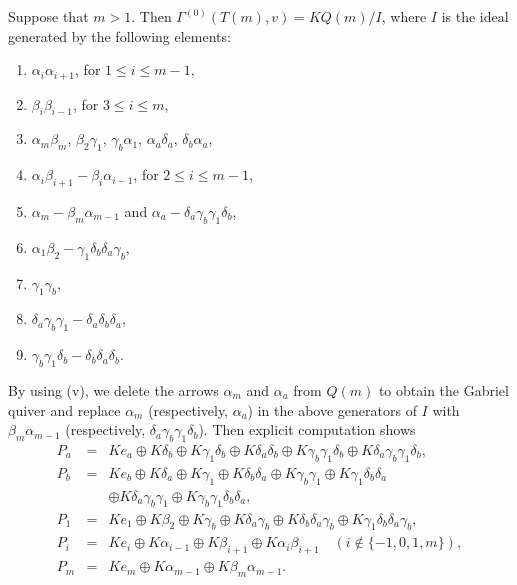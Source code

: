 \documentclass[12pt]{amsart}
\numberwithin{equation}{thm}
\begin{document}
Suppose that $m>1$. Then $\Gamma^{(0)}(T(m),v)=KQ(m)/I$, where $I$ is the ideal generated by the following elements:
\begin{enumerate}
\item $\alpha_{i}\alpha_{i+1}$, for $1\leq i\leq m-1$, 
\item $\beta_{i}\beta_{i-1}$, for $3\leq i\leq m$, 
\item $\alpha_{m}\beta_{m}$, $\beta_{2}\gamma_{1}$, $\gamma_b\alpha_1$, $\alpha_a\delta_a$, $\delta_b\alpha_a$,
\item $\alpha_{i}\beta_{i+1}-\beta_{i}\alpha_{i-1}$, for $2\leq i\leq m-1$, 
\item $\alpha_{m}-\beta_{m}\alpha_{m-1}$ and $\alpha_a-\delta_a\gamma_b\gamma_{1}\delta_b$,
\item $\alpha_{1}\beta_{2}-\gamma_{1}\delta_{b}\delta_{a}\gamma_{b}$,
\item $\gamma_{1}\gamma_{b}$,
\item $\delta_{a}\gamma_{b}\gamma_{1}-\delta_{a}\delta_{b}\delta_{a}$,
\item $\gamma_{b}\gamma_{1}\delta_{b}-\delta_{b}\delta_{a}\delta_{b}.$
\end{enumerate}
By using (v), we delete the arrows $\alpha_m$ and $\alpha_a$ from $Q(m)$ to obtain the Gabriel quiver  
and replace $\alpha_m$ (respectively, $\alpha_a$) in the above generators of 
$I$ with $\beta_{m}\alpha_{m-1}$ (respectively, $\delta_{a}\gamma_{b}\gamma_{1}\delta_{b}$). 
Then explicit computation shows 
\[\begin{array}{lcl}
P_{a} &=&Ke_{a}\oplus K\delta_{b} \oplus K\gamma_{1}\delta_{b}\oplus K\delta_{a}\delta_{b} 
\oplus K\gamma_{b}\gamma_{1}\delta_{b} \oplus K\delta_{a}\gamma_{b}\gamma_1\delta_{b}, \\
P_{b} &=& Ke_{b}\oplus K\delta_{a}\oplus K\gamma_{1} \oplus K\delta_{b}\delta_{a} 
\oplus K\gamma_{b}\gamma_{1}\oplus K\gamma_{1}\delta_{b}\delta_{a} \\
        & & \oplus K\delta_{a}\gamma_{b}\gamma_{1}\oplus K\gamma_{b}\gamma_1\delta_{b}\delta_{a}, \\
P_1  &=& Ke_1\oplus K\beta_2\oplus K\gamma_{b}\oplus K\delta_{a}\gamma_{b}
\oplus K\delta_{b}\delta_{a}\gamma_{b}\oplus K\gamma_{1}\delta_{b}\delta_{a}\gamma_{b}, \\
P_{i} &=& Ke_{i} \oplus  K\alpha_{i-1} \oplus K\beta_{i+1}\oplus K\alpha_{i}\beta_{i+1} \quad (i\notin \{-1,0,1,m\}), \\
P_m &=& Ke_m\oplus K\alpha_{m-1} \oplus K\beta_m\alpha_{m-1}.     
\end{array} \]
\end{document}
